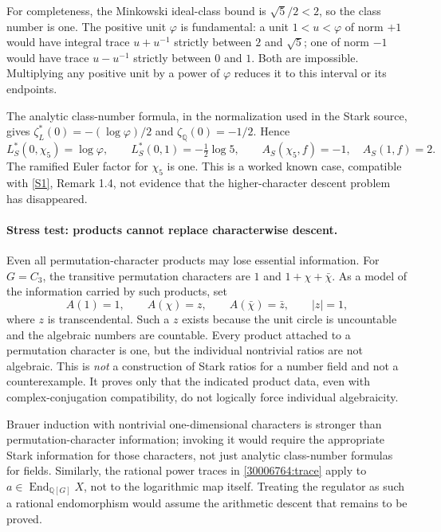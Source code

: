 \documentclass[11pt,a4paper]{article}
\newcommand{\Q}{\mathbb{Q}}
\newcommand{\sref}[2]{\hyperlink{source:#1:#2}{[S#2]}}
\numberwithin{equation}{section}
\begin{document}
For completeness, the Minkowski ideal-class bound is
$\sqrt5/2<2$, so the class number is one. The positive unit
$\varphi$ is fundamental: a unit $1<u<\varphi$ of norm $+1$ would
have integral trace $u+u^{-1}$ strictly between $2$ and $\sqrt5$;
one of norm $-1$ would have trace $u-u^{-1}$ strictly between $0$
and $1$. Both are impossible. Multiplying any positive unit by a
power of $\varphi$ reduces it to this interval or its endpoints.

The analytic class-number formula, in the normalization used in the
Stark source, gives $\zeta_L^*(0)=-(\log\varphi)/2$ and
$\zeta_{\Q}(0)=-1/2$. Hence
\begin{equation}
 L_S^*(0,\chi_5)=\log\varphi,
 \qquad L_S^*(0,1)=-\tfrac12\log5,
 \qquad A_S(\chi_5,f)=-1,\quad A_S(1,f)=2.
\end{equation}
The ramified Euler factor for $\chi_5$ is one. This is a worked known
case, compatible with \sref{30006764}{1}, Remark 1.4, not evidence that the
higher-character descent problem has disappeared.

\paragraph{Stress test: products cannot replace characterwise descent.}
Even all permutation-character products may lose essential information.
For $G=C_3$, the transitive permutation characters are $1$ and
$1+\chi+\bar\chi$. As a model of the information carried by such
products, set
\begin{equation}
 A(1)=1,\qquad A(\chi)=z,\qquad A(\bar\chi)=\bar z,
 \qquad |z|=1,
\end{equation}
where $z$ is transcendental. Such a $z$ exists because the unit circle
is uncountable and the algebraic numbers are countable. Every product
attached to a permutation character is one, but the individual
nontrivial ratios are not algebraic. This is \emph{not} a construction
of Stark ratios for a number field and not a counterexample. It proves
only that the indicated product data, even with complex-conjugation
compatibility, do not logically force individual algebraicity.

Brauer induction with nontrivial one-dimensional characters is stronger
than permutation-character information; invoking it would require the
appropriate Stark information for those characters, not just analytic
class-number formulas for fields. Similarly, the rational power traces
in \eqref{30006764:trace} apply to $a\in\operatorname{End}_{\Q[G]}X$, not to
the logarithmic map itself. Treating the regulator as such a rational
endomorphism would assume the arithmetic descent that remains to be
proved.
\end{document}
